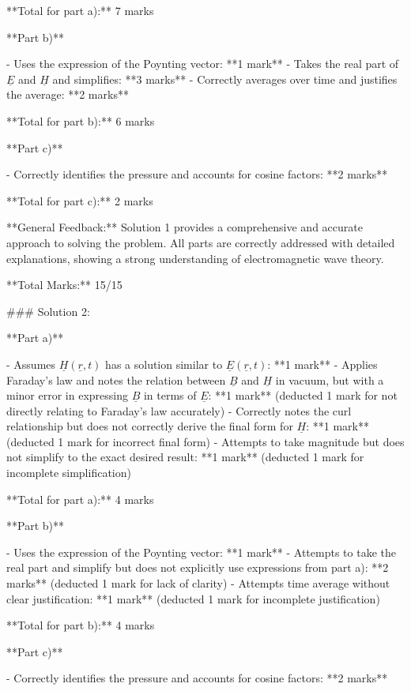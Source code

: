 \documentclass[a4paper,11pt]{article}
\begin{document}
**Total for part a):** 7 marks

**Part b)**

- Uses the expression of the Poynting vector: **1 mark**
- Takes the real part of \(\underline{E}\) and \(\underline{H}\) and simplifies: **3 marks**
- Correctly averages over time and justifies the average: **2 marks**

**Total for part b):** 6 marks

**Part c)**

- Correctly identifies the pressure and accounts for cosine factors: **2 marks**

**Total for part c):** 2 marks

**General Feedback:** Solution 1 provides a comprehensive and accurate approach to solving the problem. All parts are correctly addressed with detailed explanations, showing a strong understanding of electromagnetic wave theory.

**Total Marks:** 15/15

### Solution 2:

**Part a)**

- Assumes \(\underline{H}(\underline{r}, t)\) has a solution similar to \(\underline{E}(\underline{r}, t)\): **1 mark**
- Applies Faraday's law and notes the relation between \(\underline{B}\) and \(\underline{H}\) in vacuum, but with a minor error in expressing \(\underline{B}\) in terms of \(\underline{E}\): **1 mark** (deducted 1 mark for not directly relating to Faraday's law accurately)
- Correctly notes the curl relationship but does not correctly derive the final form for \(\underline{H}\): **1 mark** (deducted 1 mark for incorrect final form)
- Attempts to take magnitude but does not simplify to the exact desired result: **1 mark** (deducted 1 mark for incomplete simplification)

**Total for part a):** 4 marks

**Part b)**

- Uses the expression of the Poynting vector: **1 mark**
- Attempts to take the real part and simplify but does not explicitly use expressions from part a): **2 marks** (deducted 1 mark for lack of clarity)
- Attempts time average without clear justification: **1 mark** (deducted 1 mark for incomplete justification)

**Total for part b):** 4 marks

**Part c)**

- Correctly identifies the pressure and accounts for cosine factors: **2 marks**
\end{document}
